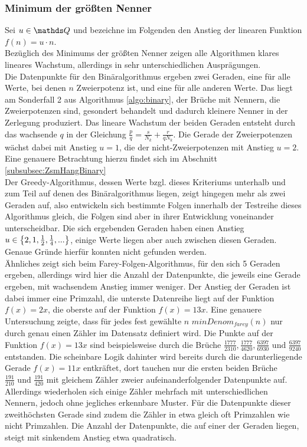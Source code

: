 \subsubsection{Minimum der größten Nenner}
Sei $u \in \Q$ und bezeichne im Folgenden den Anstieg der linearen Funktion $f(n)=u \cdot n$.\\
Bezüglich des Minimums der größten Nenner zeigen alle Algorithmen klares lineares Wachstum, allerdings in sehr unterschiedlichen Ausprägungen.\\ 
Die Datenpunkte für den Binäralgorithmus ergeben zwei Geraden, eine für alle Werte, bei denen $n$ Zweierpotenz ist, und eine für alle anderen Werte. Das liegt am Sonderfall 2 aus Algorithmus \ref{algo:binary}, der Brüche mit Nennern, die Zweierpotenzen sind, gesondert behandelt und dadurch kleinere Nenner in der Zerlegung produziert. Das lineare Wachstum der beiden Geraden entsteht durch das wachsende $q$ in der Gleichung $\frac{p}{q} = \frac{s}{N_k} + \frac{r}{qN_k}$. Die Gerade der Zweierpotenzen wächst dabei mit Anstieg $u = 1$, die der nicht-Zweierpotenzen mit Anstieg $u=2$. Eine genauere Betrachtung hierzu findet sich im Abschnitt \ref{subsubsec:ZsmHangBinary}\\
Der Greedy-Algorithmus, dessen Werte bzgl. dieses Kriteriums unterhalb und zum Teil auf denen des Binäralgorithmus liegen, zeigt hingegen mehr als zwei Geraden auf, also entwickeln sich bestimmte Folgen innerhalb der Testreihe dieses Algorithmus gleich, die Folgen sind aber in ihrer Entwicklung voneinander unterscheidbar. Die sich ergebenden Geraden haben einen Anstieg $u \in \left\{ 2, 1, \frac{1}{2}, \frac{1}{4}, ... \right\}$, einige Werte liegen aber auch zwischen diesen Geraden. Genaue Gründe hierfür konnten nicht gefunden werden.\\
Ähnliches zeigt sich beim Farey-Folgen-Algorithmus, für den sich 5 Geraden ergeben, allerdings wird hier die Anzahl der Datenpunkte, die jeweils eine Gerade ergeben, mit wachsendem Anstieg immer weniger. Der Anstieg der Geraden ist dabei immer eine Primzahl, die unterste Datenreihe liegt auf der Funktion $f(x)=2x$, die oberste auf der Funktion $f(x) = 13x$. Eine genauere Untersuchung zeigte, dass für jedes fest gewählte $n$ $minDenom_{farey}(n)$ nur durch genau einen Zähler im Datensatz definiert wird. Die Punkte auf der Funktion $f(x) = 13x$ sind beispielsweise durch die Brüche $\frac{1777}{2310}, \frac{1777}{4620}, \frac{6397}{6930} \text{ und } \frac{6397}{9240}$ entstanden. Die scheinbare Logik dahinter wird bereits durch die darunterliegende Gerade $f(x)=11x$ entkräftet, dort tauchen nur die ersten beiden Brüche $\frac{191}{210} \text{ und } \frac{191}{420}$ mit gleichem Zähler zweier aufeinanderfolgender Datenpunkte auf. Allerdings wiederholen sich einige Zähler mehrfach mit unterschiedlichen Nennern, jedoch ohne jegliches erkennbare Muster. Für die Datenpunkte dieser zweithöchsten Gerade sind zudem die Zähler in etwa gleich oft Primzahlen wie nicht Primzahlen. Die Anzahl der Datenpunkte, die auf einer der Geraden liegen, steigt mit sinkendem Anstieg etwa quadratisch.
